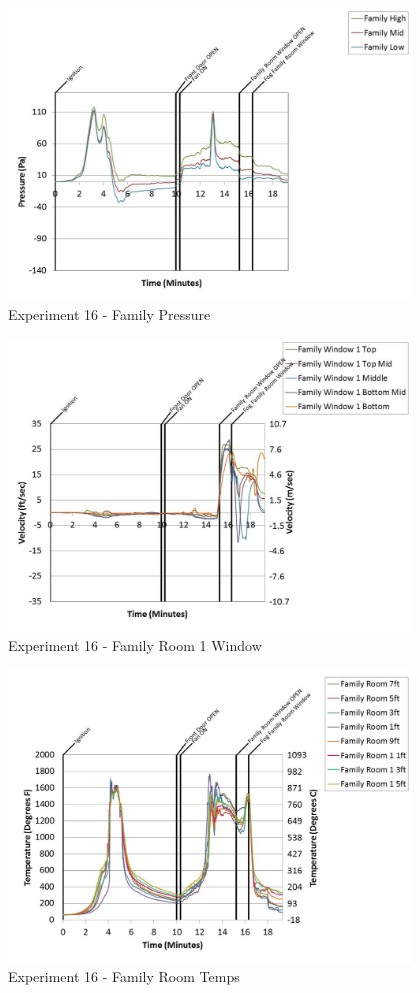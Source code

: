 \documentclass{article}
\begin{document}
\begin{appendices}
	\clearpage

	\begin{figure}[h!]
		\centering
		\includegraphics[height=3.05in]{0_Images/Results_Charts/Exp_16_Charts/FamilyPressure.pdf}
		\caption{Experiment 16 - Family Pressure}
	\end{figure}
 

	\begin{figure}[h!]
		\centering
		\includegraphics[height=3.05in]{0_Images/Results_Charts/Exp_16_Charts/FamilyRoom1Window.pdf}
		\caption{Experiment 16 - Family Room 1 Window}
	\end{figure}
 
	\clearpage

	\begin{figure}[h!]
		\centering
		\includegraphics[height=3.05in]{0_Images/Results_Charts/Exp_16_Charts/FamilyRoomTemps.pdf}
		\caption{Experiment 16 - Family Room Temps}
	\end{figure}
 


\end{appendices}
\end{document}
